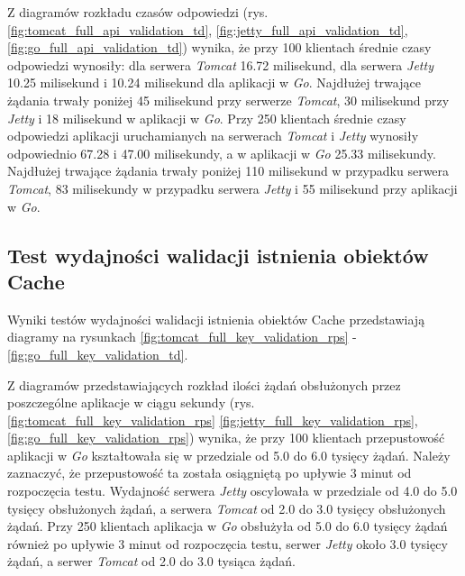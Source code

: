 Z diagramów rozkładu czasów odpowiedzi (rys. \ref{fig:tomcat_full_api_validation_td}, \ref{fig:jetty_full_api_validation_td}, \ref{fig:go_full_api_validation_td}) wynika, że przy 100 klientach średnie czasy odpowiedzi wynosiły: dla serwera \textsl{Tomcat} 16.72 milisekund, dla serwera \textsl{Jetty} 10.25 milisekund i 10.24 milisekund dla aplikacji w \textsl{Go}. Najdłużej trwające żądania trwały poniżej 45 milisekund przy serwerze \textsl{Tomcat}, 30 milisekund przy \textsl{Jetty} i 18 milisekund w aplikacji w \textsl{Go}. Przy 250 klientach średnie czasy odpowiedzi aplikacji uruchamianych na serwerach \textsl{Tomcat} i \textsl{Jetty} wynosiły odpowiednio 67.28 i 47.00 milisekundy, a w aplikacji w \textsl{Go} 25.33 milisekundy. Najdłużej trwające żądania trwały poniżej 110 milisekund w przypadku serwera \textsl{Tomcat}, 83 milisekundy w przypadku serwera \textsl{Jetty} i 55 milisekund przy aplikacji w \textsl{Go}.

% 
\clearpage

\subsection{Test wydajności walidacji istnienia obiektów Cache}
Wyniki testów wydajności walidacji istnienia obiektów Cache przedstawiają diagramy na rysunkach \ref{fig:tomcat_full_key_validation_rps} - \ref{fig:go_full_key_validation_td}.              

Z diagramów przedstawiających rozkład ilości żądań obsłużonych przez poszczególne aplikacje w ciągu sekundy  (rys. \ref{fig:tomcat_full_key_validation_rps} \ref{fig:jetty_full_key_validation_rps}, \ref{fig:go_full_key_validation_rps}) wynika, że przy 100 klientach przepustowość aplikacji w \textsl{Go} kształtowała się w przedziale od 5.0 do 6.0 tysięcy żądań. Należy zaznaczyć, że przepustowość ta została osiągniętą po upływie 3 minut od rozpoczęcia testu. Wydajność serwera \textsl{Jetty} oscylowała w przedziale od 4.0 do 5.0 tysięcy obsłużonych żądań, a serwera \textsl{Tomcat} od 2.0 do 3.0 tysięcy obsłużonych żądań. Przy 250 klientach aplikacja w \textsl{Go} obsłużyła od 5.0 do 6.0 tysięcy żądań również po upływie 3 minut od rozpoczęcia testu, serwer \textsl{Jetty} około 3.0 tysięcy żądań, a serwer \textsl{Tomcat} od 2.0 do 3.0 tysiąca żądań.

